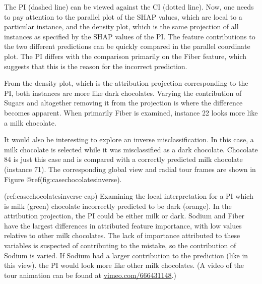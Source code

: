 \documentclass[
]{article}
\begin{document}
The PI (dashed line) can be viewed against the CI (dotted line). Now,
one needs to pay attention to the parallel plot of the SHAP values,
which are local to a particular instance, and the density plot, which is
the same projection of all instances as specified by the SHAP values of
the PI. The feature contributions to the two different predictions can
be quickly compared in the parallel coordinate plot. The PI differs with
the comparison primarily on the Fiber feature, which suggests that this
is the reason for the incorrect prediction.

From the density plot, which is the attribution projection corresponding
to the PI, both instances are more like dark chocolates. Varying the
contribution of Sugars and altogether removing it from the projection is
where the difference becomes apparent. When primarily Fiber is examined,
instance 22 looks more like a milk chocolate.

It would also be interesting to explore an inverse misclassification. In
this case, a milk chocolate is selected while it was misclassified as a
dark chocolate. Chocolate 84 is just this case and is compared with a
correctly predicted milk chocolate (instance 71). The corresponding
global view and radial tour frames are shown in Figure
@ref(fig:casechocolatesinverse).

(ref:casechocolatesinverse-cap) Examining the local interpretation for a
PI which is milk (green) chocolate incorrectly predicted to be dark
(orange). In the attribution projection, the PI could be either milk or
dark. Sodium and Fiber have the largest differences in attributed
feature importance, with low values relative to other milk chocolates.
The lack of importance attributed to these variables is suspected of
contributing to the mistake, so the contribution of Sodium is varied. If
Sodium had a larger contribution to the prediction (like in this view).
the PI would look more like other milk chocolates. (A video of the tour
animation can be found at
\href{https://vimeo.com/666431148}{vimeo.com/666431148}.)
\end{document}
